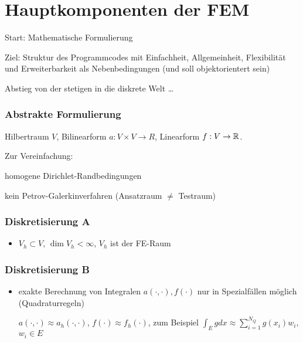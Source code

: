 \section{Hauptkomponenten der FEM}

Start: Mathematische Formulierung

Ziel: Struktur des Programmcodes mit Einfachheit, Allgemeinheit, Flexibilität und Erweiterbarkeit als Nebenbedingungen (und soll objektorientert sein)

Abstieg von der stetigen in die diskrete Welt \dots
\setcounter{subsection}{0}
\subsubsection{Abstrakte Formulierung}
Hilbertraum $V$, Bilinearform $a: V\times V \to R$, Linearform $f: V \to \mathbb{R}$.
\begin{center}
\end{center}
\begin{bemerkung}
  Zur Vereinfachung: 
\item homogene Dirichlet-Randbedingungen
\item kein Petrov-Galerkinverfahren (Ansatzraum $\neq$ Testraum)
\end{bemerkung}
\subsubsection{Diskretisierung A}
\begin{itemize}
\item $V_h \subset V$, $\dim V_h < \infty$, $V_h$ ist der FE-Raum
  \begin{center}
  \end{center}
\end{itemize}
\subsubsection{Diskretisierung B}
\begin{itemize}
\item exakte Berechnung von Integralen $a(\cdot, \cdot), f(\cdot)$ nur in Spezialfällen möglich (Quadraturregeln)

$a(\cdot, \cdot) \approx a_h(\cdot, \cdot)$, $ f(\cdot) \approx f_h(\cdot)$, zum Beispiel $\int_E g dx \approx \sum_{i = 1}^{N_Q} g(x_i)w_i$, $w_i \in E$
\end{itemize}
\begin{center}
\end{center}
